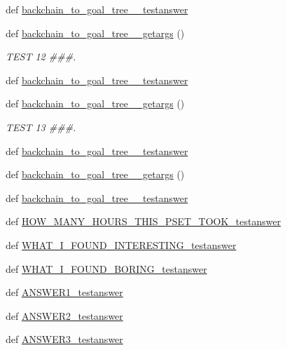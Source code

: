 \begin{DoxyCompactItemize}
def \hyperlink{namespacetests_a24f12472a2f3d045583e3a1e03af88df}{backchain\+\_\+to\+\_\+goal\+\_\+tree\+\_\+\_\+testanswer}
\item 
def \hyperlink{namespacetests_a076ac891f09ebdad7fb228fc1336b653}{backchain\+\_\+to\+\_\+goal\+\_\+tree\+\_\+\_\+getargs} ()
\begin{DoxyCompactList}\small\item\em T\+E\+S\+T 12 \#\#\#. \end{DoxyCompactList}\item 
def \hyperlink{namespacetests_a219d9713f1dc40f384d24f13be881b8e}{backchain\+\_\+to\+\_\+goal\+\_\+tree\+\_\+\_\+testanswer}
\item 
def \hyperlink{namespacetests_ac16fdf70c0f8c2505b531f86ffa9b2c2}{backchain\+\_\+to\+\_\+goal\+\_\+tree\+\_\+\_\+getargs} ()
\begin{DoxyCompactList}\small\item\em T\+E\+S\+T 13 \#\#\#. \end{DoxyCompactList}\item 
def \hyperlink{namespacetests_ad0f26c96cd1563b8859472371eafe0de}{backchain\+\_\+to\+\_\+goal\+\_\+tree\+\_\+\_\+testanswer}
\item 
def \hyperlink{namespacetests_a9ceef10b215ad57f2a0f0cdeec7ef880}{backchain\+\_\+to\+\_\+goal\+\_\+tree\+\_\+\_\+getargs} ()
\item 
def \hyperlink{namespacetests_a713e7a631dbf9c55a2491cf636958a97}{backchain\+\_\+to\+\_\+goal\+\_\+tree\+\_\+\_\+testanswer}
\item 
def \hyperlink{namespacetests_ae1499c56736253155f79b3e74da4d965}{H\+O\+W\+\_\+\+M\+A\+N\+Y\+\_\+\+H\+O\+U\+R\+S\+\_\+\+T\+H\+I\+S\+\_\+\+P\+S\+E\+T\+\_\+\+T\+O\+O\+K\+\_\+testanswer}
\item 
def \hyperlink{namespacetests_ad0f0f17aefd4844393d9db636b4124ac}{W\+H\+A\+T\+\_\+\+I\+\_\+\+F\+O\+U\+N\+D\+\_\+\+I\+N\+T\+E\+R\+E\+S\+T\+I\+N\+G\+\_\+testanswer}
\item 
def \hyperlink{namespacetests_a13f88cd85ed586d95912e20ea25a5745}{W\+H\+A\+T\+\_\+\+I\+\_\+\+F\+O\+U\+N\+D\+\_\+\+B\+O\+R\+I\+N\+G\+\_\+testanswer}
\item 
def \hyperlink{namespacetests_a9c9b0c368058486c9ea41c46c85e1189}{A\+N\+S\+W\+E\+R1\+\_\+testanswer}
\item 
def \hyperlink{namespacetests_a8589b0e0c6ca752301ed2182bb1f94ec}{A\+N\+S\+W\+E\+R2\+\_\+testanswer}
\item 
def \hyperlink{namespacetests_aa4f1bc1cec31cb0661fda3a55605b01a}{A\+N\+S\+W\+E\+R3\+\_\+testanswer}

\end{DoxyCompactItemize}
